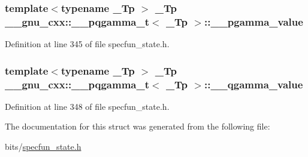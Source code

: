\subsubsection[{\texorpdfstring{\+\_\+\+\_\+pgamma\+\_\+value}{__pgamma_value}}]{\setlength{\rightskip}{0pt plus 5cm}template$<$typename \+\_\+\+Tp $>$ \+\_\+\+Tp {\bf \+\_\+\+\_\+gnu\+\_\+cxx\+::\+\_\+\+\_\+pqgamma\+\_\+t}$<$ \+\_\+\+Tp $>$\+::\+\_\+\+\_\+pgamma\+\_\+value}\hypertarget{struct____gnu__cxx_1_1____pqgamma__t_aa12fa3fb5718738b5cb10fb1ac0eee46}{}\label{struct____gnu__cxx_1_1____pqgamma__t_aa12fa3fb5718738b5cb10fb1ac0eee46}


Definition at line 345 of file specfun\+\_\+state.\+h.

\subsubsection[{\texorpdfstring{\+\_\+\+\_\+qgamma\+\_\+value}{__qgamma_value}}]{\setlength{\rightskip}{0pt plus 5cm}template$<$typename \+\_\+\+Tp $>$ \+\_\+\+Tp {\bf \+\_\+\+\_\+gnu\+\_\+cxx\+::\+\_\+\+\_\+pqgamma\+\_\+t}$<$ \+\_\+\+Tp $>$\+::\+\_\+\+\_\+qgamma\+\_\+value}\hypertarget{struct____gnu__cxx_1_1____pqgamma__t_ab053b01578e22ba923ca2a4007b1f0a7}{}\label{struct____gnu__cxx_1_1____pqgamma__t_ab053b01578e22ba923ca2a4007b1f0a7}


Definition at line 348 of file specfun\+\_\+state.\+h.



The documentation for this struct was generated from the following file\+:\begin{DoxyCompactItemize}
\item 
bits/\hyperlink{specfun__state_8h}{specfun\+\_\+state.\+h}\end{DoxyCompactItemize}
